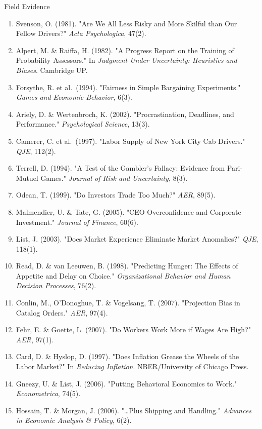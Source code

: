 \documentclass[10pt]{beamer}
\begin{document}
\begin{frame}[allowframebreaks]{Field Evidence}
\footnotesize
\begin{enumerate}
\item Svenson, O. (1981). "Are We All Less Risky and More Skilful than Our Fellow Drivers?" \emph{Acta Psychologica}, 47(2).
\item Alpert, M. \& Raiffa, H. (1982). "A Progress Report on the Training of Probability Assessors." In \emph{Judgment Under Uncertainty: Heuristics and Biases}. Cambridge UP.
\item Forsythe, R. et al.\ (1994). "Fairness in Simple Bargaining Experiments." \emph{Games and Economic Behavior}, 6(3).
\item Ariely, D. \& Wertenbroch, K. (2002). "Procrastination, Deadlines, and Performance." \emph{Psychological Science}, 13(3).
\item Camerer, C. et al.\ (1997). "Labor Supply of New York City Cab Drivers." \emph{QJE}, 112(2).
\item Terrell, D. (1994). "A Test of the Gambler's Fallacy: Evidence from Pari-Mutuel Games." \emph{Journal of Risk and Uncertainty}, 8(3).
\item Odean, T. (1999). "Do Investors Trade Too Much?" \emph{AER}, 89(5).
\item Malmendier, U. \& Tate, G. (2005). "CEO Overconfidence and Corporate Investment." \emph{Journal of Finance}, 60(6).
\item List, J. (2003). "Does Market Experience Eliminate Market Anomalies?" \emph{QJE}, 118(1).
\item Read, D. \& van Leeuwen, B. (1998). "Predicting Hunger: The Effects of Appetite and Delay on Choice." \emph{Organizational Behavior and Human Decision Processes}, 76(2).
\item Conlin, M., O'Donoghue, T. \& Vogelsang, T. (2007). "Projection Bias in Catalog Orders." \emph{AER}, 97(4).
\item Fehr, E. \& Goette, L. (2007). "Do Workers Work More if Wages Are High?" \emph{AER}, 97(1).
\item Card, D. \& Hyslop, D. (1997). "Does Inflation Grease the Wheels of the Labor Market?" In \emph{Reducing Inflation}. NBER/University of Chicago Press.
\item Gneezy, U. \& List, J. (2006). "Putting Behavioral Economics to Work." \emph{Econometrica}, 74(5).
\item Hossain, T. \& Morgan, J. (2006). "\ldots Plus Shipping and Handling." \emph{Advances in Economic Analysis \& Policy}, 6(2).

\end{enumerate}
\end{frame}
\end{document}
